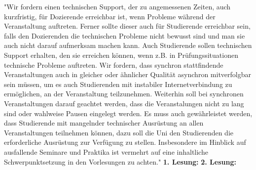     {
        "Wir fordern einen technischen Support, der zu angemessenen Zeiten, auch kurzfristig,
        für
        Dozierende erreichbar ist, wenn Probleme während der Veranstaltung auftreten. Ferner
        sollte dieser
        auch für Studierende erreichbar sein, falls den Dozierenden die technischen Probleme
        nicht bewusst
        sind und man sie auch nicht darauf aufmerksam machen kann.
        Auch Studierende sollen technischen Support erhalten, den sie erreichen können, wenn
        z.B. in
        Prüfungssituationen technische Probleme auftreten.
        Wir fordern, dass synchron stattfindende Veranstaltungen auch in gleicher oder
        ähnlicher Qualität
        asynchron mitverfolgbar sein müssen, um es auch Studierenden mit instabiler
        Internetverbindung zu
        ermöglichen, an der Veranstaltung teilzunehmen.
        Weiterhin soll bei synchronen Veranstaltungen darauf geachtet werden, dass die
        Veranstalungen
        nicht zu lang sind oder wahlweise Pausen eingelegt werden.
        Es muss auch gewährleistet werden, dass Studierende mit mangelnder technischer
        Ausrüstung an
        allen Veranstaltungen teilnehmen können, dazu soll die Uni den Studierenden die
        erforderliche
        Ausrüstung zur Verfügung zu stellen.
        Insbesondere im Hinblick auf ausfallende Seminare und Praktika ist vermehrt auf eine
        inhaltliche
        Schwerpunktsetzung in den Vorlesungen zu achten."
    }{
    }{
        \textbf{1. Lesung:}
        \ul{}
        \textbf{2. Lesung:}
        \ul{}
    }{
    }
